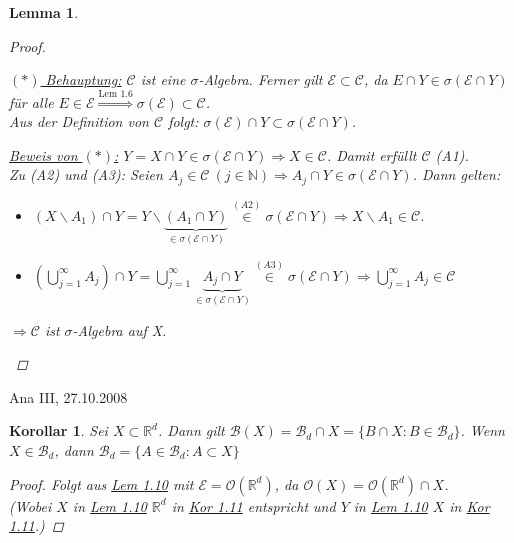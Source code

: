 \documentclass[a4paper]{report}
\newcommand{\R}{\mathbb{R}}
\newcommand{\N}{\mathbb{N}}
\newcommand{\Borel}{\mathcal{B}}
\newcommand{\Bd}{\Borel_d}
\newcommand{\jlabel}[1]{\label{j_#1}}
\newcommand{\jshortlink}[1]{\jhyperref{#1}{\text{#1}}}
\newcommand{\jhyperref}[2]{\hyperref[j_#1]{#2}}
\newcommand{\jlink}[1]{\jhyperref{#1}{#1}}
\newcommand{\jspacesmall}{\vspace{4pt}}
\newcommand{\jdate}[1]{\jspacesmall\begin{center}\jlabel{#1}\tiny{Ana III, #1}\end{center}}
\theoremstyle{plain}
\newtheorem{lem}[thm]{Lemma}
\newtheorem{kor}[thm]{Korollar}
\theoremstyle{definition}
\begin{document}
{{\begin{lem}
\begin{proof}
\begin{enumerate}
                \jspacesmall
                
                \uline{$(*)$ Behauptung:} $\mathcal{C}$ ist eine $\sigma$-Algebra. Ferner gilt $\mathcal{E} \subset \mathcal{C}$, da $E \cap Y \in \sigma(\mathcal{E} \cap Y)$ für alle $E \in \mathcal{E} \overset{\jshortlink{Lem 1.6}}{\Rightarrow} \sigma(\mathcal{E}) \subset \mathcal{C}$.\\
                Aus der Definition von $\mathcal{C}$ folgt: $\sigma(\mathcal{E}) \cap Y \subset \sigma(\mathcal{E} \cap Y)$.
                
                \jspacesmall
                
                \uline{Beweis von $(*)$:}
                $Y = X \cap Y \in \sigma(\mathcal{E} \cap Y) \Rightarrow X \in \mathcal{C}$. Damit erfüllt $\mathcal{C}$ (A1).\\
                Zu (A2) und (A3): Seien $A_j \in \mathcal{C} \ (j \in \N) \Rightarrow A_j \cap Y \in \sigma(\mathcal{E} \cap Y)$. Dann gelten:
                \begin{itemize}
                    \item $(X\backslash A_1) \cap Y = Y \backslash \underbrace{(A_1 \cap Y)}_{\in \sigma(\mathcal{E} \cap Y)} \overset{(A2)}{\in} \sigma(\mathcal{E} \cap Y) \Rightarrow X \backslash A_1 \in \mathcal{C}$.
                    \item $(\bigcup_{j=1}^{\infty} A_j) \cap Y = \bigcup_{j=1}^\infty \underbrace{A_j \cap Y}_{\in \sigma(\mathcal{E} \cap Y)} \overset{(A3)}{\in} \sigma(\mathcal{E} \cap Y) \Rightarrow \bigcup_{j=1}^\infty A_j \in \mathcal{C}$
                \end{itemize}
                $\Rightarrow \mathcal{C}$ ist $\sigma$-Algebra auf X.
        \end{enumerate}

    \end{proof}
\end{lem}

\jdate{27.10.2008}

\begin{kor}
\jlabel{Kor 1.11}
    Sei $X \subset \R^d$. Dann gilt $\Borel(X) = \Bd \cap X = \{B \cap X : B \in \Bd\}$.
    Wenn $X \in \Bd$, dann $\Bd = \{A\in \Bd : A \subset X\}$
    \begin{proof}
        Folgt aus \jlink{Lem 1.10} mit $\mathcal{E} = \mathcal{O}(\R^d)$, da $\mathcal{O}(X) = \mathcal{O}(\R^d) \cap X$.\\
        (Wobei $X$ in \jlink{Lem 1.10} $\R^d$ in \jlink{Kor 1.11} entspricht und $Y$ in \jlink{Lem 1.10} $X$ in \jlink{Kor 1.11}.)
    \end{proof}
\end{kor}

}}
\end{document}
